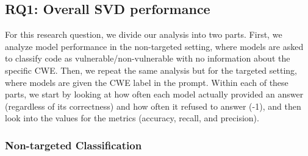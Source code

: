\documentclass[lettersize,journal]{IEEEtran}
\begin{document}
\subsection{RQ1: Overall \gls{SVD} performance}

For this research question, we divide our analysis into two parts. First, we analyze model performance in the non-targeted setting, where models are asked to classify code as vulnerable/non-vulnerable with no information about the specific CWE. Then, we repeat the same analysis but for the targeted setting, where models are given the \gls{CWE} label in the prompt. Within each of these parts, we start by looking at how often each model actually provided an answer (regardless of its correctness) and how often it refused to answer (-1), and then look into the values for the metrics (accuracy, recall, and precision).

\subsubsection{Non-targeted Classification}


\begin{table}[!t]
\centering
\caption{Abstention rates (\%) for non-targeted and targeted \gls{SVD}.}
\label{tab:res-dist-abstention}
\small
\setlength{\tabcolsep}{10pt}
\renewcommand{\arraystretch}{1.05}
\end{table}
\end{document}
